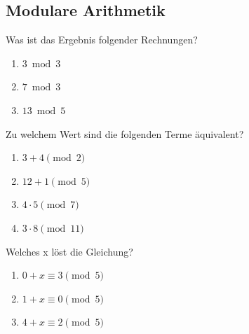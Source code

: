 \documentclass[11pt, a4paper]{article}
\newif\ifshowsolution
\begin{document}
\subsection{Modulare Arithmetik}
Was ist das Ergebnis folgender Rechnungen?
\begin{enumerate}
	\item $3 \bmod 3$
	
	\ifshowsolution
		$3 \bmod 3 \equiv 0$
	\fi
	
	\item $7 \bmod 3$
	
	\ifshowsolution
		$7 \bmod 3 \equiv 1$
	\fi
	
	\item $13 \bmod 5$
	
	\ifshowsolution
		$13 \bmod 5 \equiv 3$
	\fi
	
\end{enumerate}
Zu welchem Wert sind die folgenden Terme äquivalent?
\begin{enumerate}
	\item $3 + 4 \pmod 2$
	
	\ifshowsolution
		$3 + 4 \pmod 2 \equiv 1$
	\fi
	
	\item $12 + 1 \pmod 5$
	
	\ifshowsolution
		$12 + 1 \pmod 5 \equiv 3$
	\fi
	
	\item $4 \cdot 5 \pmod 7$
	
	\ifshowsolution
		$4 \cdot 5 \pmod 7 \equiv 6$
	\fi
	
	\item $3 \cdot 8 \pmod {11}$
	
	\ifshowsolution
		$3 \cdot 8 \pmod {11} \equiv 2$
	\fi
	
\end{enumerate}
Welches x löst die Gleichung?
\begin{enumerate}
	\item $0 + x \equiv 3 \pmod 5$
	
	\ifshowsolution
		$x \equiv 3$
	\fi
	
	\item $1 + x \equiv 0 \pmod 5$
	
	\ifshowsolution
		$x \equiv 4$
	\fi
	
	\item $4 + x \equiv 2 \pmod 5$
	
	\ifshowsolution
		$x \equiv 3$
	\fi
\end{enumerate}
\end{document}
